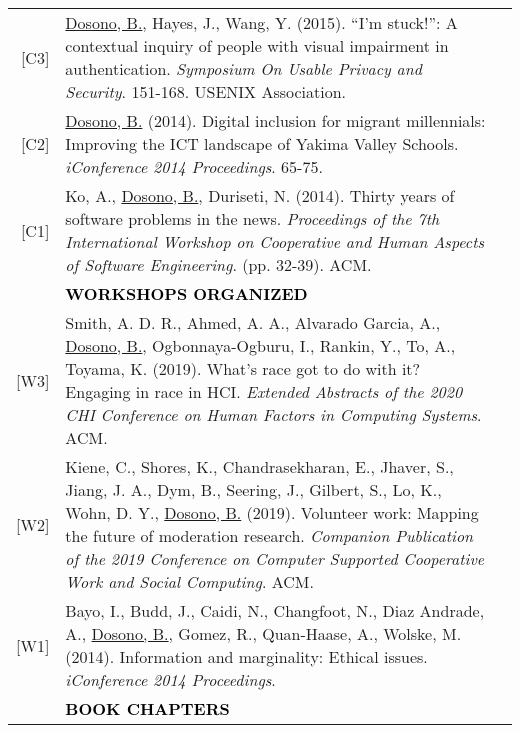 \documentclass[11pt]{article}
\begin{document}
{{\begin{longtable}{Rp{0.75in}p{5.0in}}
\footnotesize{[C3]} & \href{https://www.usenix.org/conference/soups2015/proceedings/presentation/dosono}{{Dosono, B.}}, Hayes, J., Wang, Y. (2015). ``I'm stuck!'': A contextual inquiry of people with visual impairment in authentication. \textit{Symposium On Usable Privacy and Security}. 151-168. USENIX Association.\\

\footnotesize{[C2]} & \href{https://doi.org/10.9776/14043}{{Dosono, B.}} (2014). Digital inclusion for migrant millennials: Improving the ICT landscape of Yakima Valley Schools. \textit{iConference 2014 Proceedings}. 65-75.\\

\footnotesize{[C1]} & Ko, A., \href{https://dl.acm.org/authorize?N41457}{{Dosono, B.}}, Duriseti, N. (2014). Thirty years of software problems in the news. \textit{Proceedings of the 7th International Workshop on Cooperative and Human Aspects of Software Engineering}. (pp. 32-39). ACM.\\

& \textcolor{black}{\uppercase{\textbf{Workshops Organized}}}\\

\footnotesize{[W3]} & Smith, A. D. R., Ahmed, A. A., Alvarado Garcia, A., \href{https://dl.acm.org/doi/10.1145/3334480.3375156?cid=88158835957}{{Dosono, B.}}, Ogbonnaya-Ogburu, I., Rankin, Y., To, A., Toyama, K. (2019). What's race got to do with it? Engaging in race in HCI. \textit{Extended Abstracts of the 2020 CHI Conference on Human Factors in Computing Systems}. ACM.\\

\footnotesize{[W2]} & Kiene, C., Shores, K., Chandrasekharan, E., Jhaver, S., Jiang, J. A., Dym, B., Seering, J., Gilbert, S., Lo, K., Wohn, D. Y., \href{https://dl.acm.org/authorize?N690536}{{Dosono, B.}} (2019). Volunteer work: Mapping the future of moderation research. \textit{Companion Publication of the 2019 Conference on Computer Supported Cooperative Work and Social Computing}. ACM.\\

\footnotesize{[W1]} & Bayo, I., Budd, J., Caidi, N., Changfoot, N., Diaz Andrade, A., \href{https://doi.org/10.9776/14223}{{Dosono, B.}}, Gomez, R., Quan-Haase, A., Wolske, M. (2014). Information and marginality: Ethical issues. \textit{iConference 2014 Proceedings}.\\

& \textcolor{black}{\uppercase{\textbf{Book Chapters}}}\\


\end{longtable}}}
\end{document}
